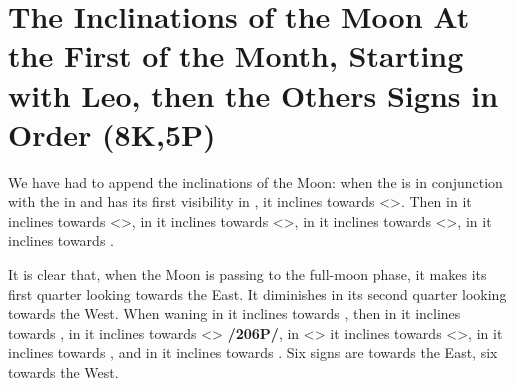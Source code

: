 \section{The Inclinations of the Moon At the First of the Month, Starting with Leo, then the Others Signs in Order (8K,5P)}

We have had to append the inclinations of the Moon: when the \Moon\xspace is in conjunction with the \Sun\xspace in
\Cancer\xspace and has its first visibility in \Leo, it inclines towards <\Taurus>. Then in \Virgo\xspace it inclines towards <\Aries>, in \Libra\xspace it inclines towards <\Pisces>, in \Scorpio\xspace it inclines towards <\Aquarius>, in \Sagittarius\xspace it inclines towards \Capricorn. 

It is clear that, when the Moon is passing to the full-moon phase, it makes its first quarter looking towards the East. It diminishes in its second quarter looking towards the West. When waning in \Capricorn\xspace it inclines towards \Sagittarius, then in \Aquarius it inclines towards \Scorpio, in \Pisces\xspace it inclines towards <\Libra> \textbf{/206P/}, in <\Aries> it inclines towards <\Virgo>, in \Taurus\xspace it inclines towards \Leo, and in \Gemini\xspace it inclines towards \Cancer. Six signs are towards the East, six towards the West.

